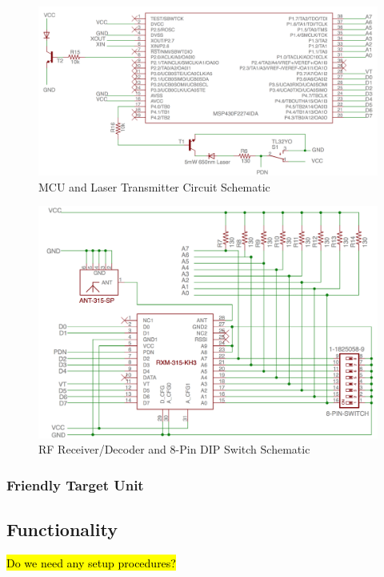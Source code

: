 \documentclass[letterpaper,10pt]{article}
\begin{document}
\begin{spacing}{1.15}
\begin{figure} [H]
	\centering
	\includegraphics[scale=0.43]{MCU_Laser_Schematic.png}
	\caption{MCU and Laser Transmitter Circuit Schematic\label{fig:mcu-laser-schematic}}
\end{figure}

\begin{figure} [H]
	\centering
	\includegraphics[scale=0.5]{RF_Receiver_Decoder_Schematic.png}
	\caption{RF Receiver/Decoder and 8-Pin DIP Switch Schematic\label{fig:rf-receiver-decoder-schematic}}
\end{figure}


\subsubsection{Friendly Target Unit}

\subsection{Functionality} \label{section-functionality}
\hl{Do we need any setup procedures?}



\end{spacing}
\end{document}
